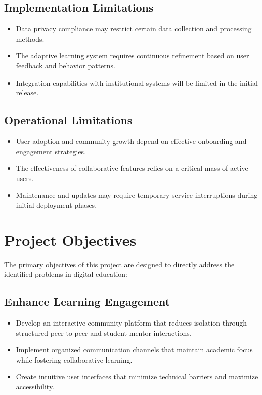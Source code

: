 \subsection{Implementation Limitations}
\label{subsec:implementation_limitations}
\begin{itemize}
    \item Data privacy compliance may restrict certain data collection and processing methods.
    \item The adaptive learning system requires continuous refinement based on user feedback and behavior patterns.
    \item Integration capabilities with institutional systems will be limited in the initial release.
\end{itemize}

\subsection{Operational Limitations}
\label{subsec:operational_limitations}
\begin{itemize}
    \item User adoption and community growth depend on effective onboarding and engagement strategies.
    \item The effectiveness of collaborative features relies on a critical mass of active users.
    \item Maintenance and updates may require temporary service interruptions during initial deployment phases.
\end{itemize}

\section{Project Objectives}
\label{sec:project_objectives}
The primary objectives of this project are designed to directly address the identified problems in digital education:

\subsection{Enhance Learning Engagement}
\label{subsec:enhance_engagement}
\begin{itemize}
    \item Develop an interactive community platform that reduces isolation through structured peer-to-peer and student-mentor interactions.
    \item Implement organized communication channels that maintain academic focus while fostering collaborative learning.
    \item Create intuitive user interfaces that minimize technical barriers and maximize accessibility.
\end{itemize}

